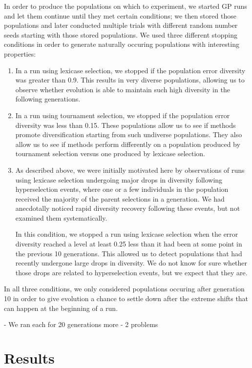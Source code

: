 \documentclass{sig-alternate-05-2015}
\begin{document}
In order to produce the populations on which to experiment, we started GP runs and let them continue until they met certain conditions; we then stored those populations and later conducted multiple trials with different random number seeds starting with those stored populations. We used three different stopping conditions in order to generate naturally occuring populations with interesting properties:
\begin{enumerate}
\item
In a run using lexicase selection, we stopped if the population error diversity was greater than 0.9. This results in very diverse populations, allowing us to observe whether evolution is able to maintain such high diversity in the following generations.

\item
In a run using tournament selection, we stopped if the population error diversity was less than 0.15. These populations allow us to see if methods promote diversification starting from such undiverse populations. They also allow us to see if methods perform differently on a population produced by tournament selection versus one produced by lexicase selection.

\item
As described above, we were initially motivated here by observations of runs using lexicase selection undergoing major drops in diversity following hyperselection events, where one or a few individuals in the population received the majority of the parent selections in a generation. We had anecdotally noticed rapid diversity recovery following these events, but not examined them systematically.

In this condition, we stopped a run using lexicase selection when the error diversity reached a level at least 0.25 less than it had been at some point in the previous 10 generations. This allowed us to detect populations that had recently undergone large drops in diversity. We do not know for sure whether those drops are related to hyperselection events, but we expect that they are.

\end{enumerate}
In all three conditions, we only considered populations occuring after generation 10 in order to give evolution a chance to settle down after the extreme shifts that can happen at the beginning of a run.

- We ran each for 20 generations more
- 2 problems


\section{Results}
\label{sec:results}
\end{document}
